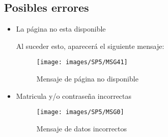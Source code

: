         \subsection{Posibles errores}
        
            \begin{itemize}
                \item La página no esta disponible
                
                    Al suceder esto, aparecerá el siguiente mensaje:
                    \begin{figure}[!hbtp]
                        \centering
                        \hypertarget{MSG41}{\texttt{[image: images/SP5/MSG41]}}
                        \caption{Mensaje de página no disponible}
                    \end{figure}
                    
                \item Matricula y/o contraseña incorrectas
                    \begin{figure}[!hbtp]
                        \centering
                        \hypertarget{MSG0}{\texttt{[image: images/SP5/MSG0]}}
                        \caption{Mensaje de datos incorrectos}
                    \end{figure}
                    
            \end{itemize}
